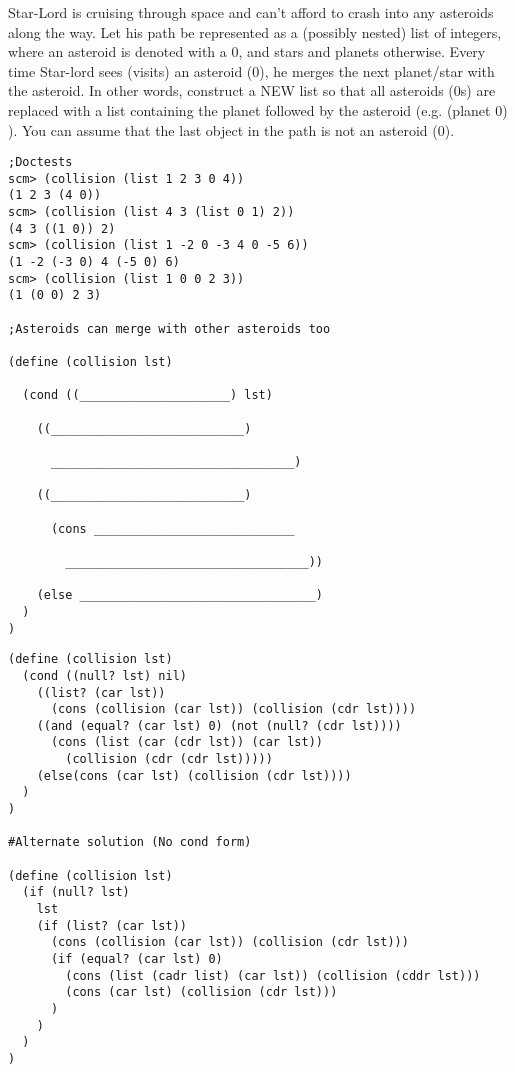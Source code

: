\begin{blocksection}
\question Star-Lord is cruising through space and can’t afford to crash into any asteroids along the way. Let his path be represented as a (possibly nested) list of integers, where an asteroid is denoted with a 0, and stars and planets otherwise. Every time Star-lord sees (visits) an asteroid (0), he merges the next planet/star with the asteroid. In other words, construct a NEW list so that all asteroids (0s) are replaced with a list containing the planet followed by the asteroid (e.g. (planet 0) ). You can assume that the last object in the path is not an asteroid (0).

\begin{lstlisting}
;Doctests
scm> (collision (list 1 2 3 0 4))
(1 2 3 (4 0))
scm> (collision (list 4 3 (list 0 1) 2))
(4 3 ((1 0)) 2)
scm> (collision (list 1 -2 0 -3 4 0 -5 6))
(1 -2 (-3 0) 4 (-5 0) 6)
scm> (collision (list 1 0 0 2 3))
(1 (0 0) 2 3) 

;Asteroids can merge with other asteroids too

(define (collision lst)

  (cond ((_____________________) lst)

    ((___________________________)

      __________________________________)

    ((___________________________)

      (cons ____________________________

        __________________________________))

    (else _________________________________)
  )
)

\end{lstlisting}
\end{blocksection}

\begin{solution}
\begin{blocksection}
\begin{lstlisting}
(define (collision lst)
  (cond ((null? lst) nil)
    ((list? (car lst))
      (cons (collision (car lst)) (collision (cdr lst))))
    ((and (equal? (car lst) 0) (not (null? (cdr lst))))
      (cons (list (car (cdr lst)) (car lst))
        (collision (cdr (cdr lst)))))
    (else(cons (car lst) (collision (cdr lst))))
  )
)

#Alternate solution (No cond form)

(define (collision lst)
  (if (null? lst)
    lst
    (if (list? (car lst))
      (cons (collision (car lst)) (collision (cdr lst)))
      (if (equal? (car lst) 0)
        (cons (list (cadr list) (car lst)) (collision (cddr lst)))
        (cons (car lst) (collision (cdr lst)))
      )
    )
  )
)
\end{lstlisting}
\end{blocksection}
\end{solution}